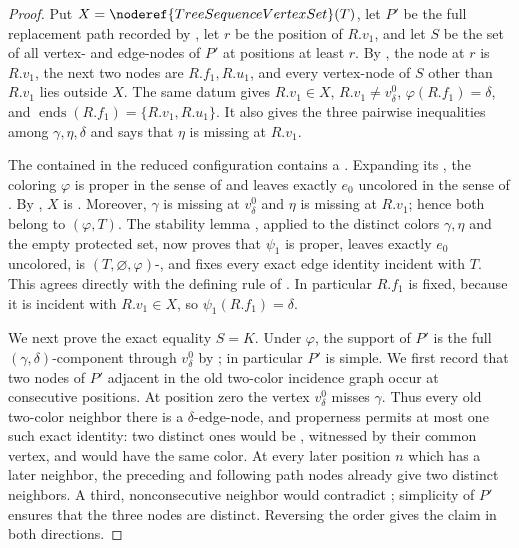 \begin{proof}
Put $X=\noderef{TreeSequenceVertexSet}(T)$, let $P'$ be the full
replacement path recorded by , let $r$ be
the position of $R.v_1$, and let $S$ be the set of all vertex- and
edge-nodes of $P'$ at positions at least $r$.  By
, the node at $r$ is $R.v_1$, the
next two nodes are $R.f_1,R.u_1$, and every vertex-node of $S$ other
than $R.v_1$ lies outside $X$.  The same datum gives
$R.v_1\in X$, $R.v_1\ne v^0_\delta$,
$\varphi(R.f_1)=\delta$, and
$\operatorname{ends}(R.f_1)=\{R.v_1,R.u_1\}$.  It also gives the three
pairwise inequalities among $\gamma,\eta,\delta$ and says that
$\eta$ is missing at $R.v_1$.

The  contained in the reduced
configuration contains a .  Expanding its
, the coloring $\varphi$ is proper in the sense of
 and leaves exactly $e_0$ uncolored in the
sense of .  By
, $X$ is
.  Moreover, $\gamma$ is missing at
$v^0_\delta$ and $\eta$ is missing at $R.v_1$; hence both belong to
$(\varphi,T)$.  The stability lemma
, applied to the distinct colors
$\gamma,\eta$ and the empty protected set, now proves that $\psi_1$ is
proper, leaves exactly $e_0$ uncolored, is
$(T,\varnothing,\varphi)$-, and fixes every exact
edge identity incident with $T$.  This agrees directly with the defining
rule of .  In particular $R.f_1$ is fixed,
because it is incident with $R.v_1\in X$, so
$\psi_1(R.f_1)=\delta$.

We next prove the exact equality $S=K$.  Under $\varphi$, the support of
$P'$ is the full $(\gamma,\delta)$-component through
$v^0_\delta$ by ; in particular $P'$
is simple.  We first record that two nodes of $P'$ adjacent in the old
two-color incidence graph occur at consecutive positions.  At position
zero the vertex $v^0_\delta$ misses $\gamma$.  Thus every old two-color
neighbor there is a $\delta$-edge-node, and properness permits at most one
such exact identity: two distinct ones would be
, witnessed by their common
 vertex, and would have the same color.  At every later
position $n$ which has a later neighbor, the preceding and following
path nodes already give two distinct neighbors.  A third, nonconsecutive
neighbor would contradict
; simplicity of $P'$ ensures
that the three nodes are distinct.  Reversing the order gives the claim
in both directions.


\end{proof}
